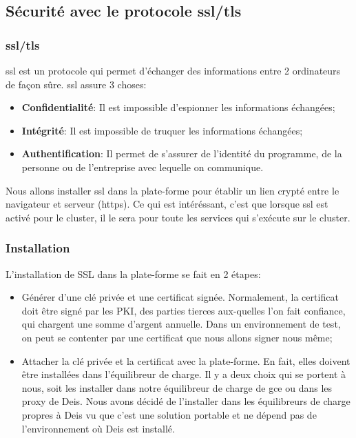 \begin{onehalfspace}
\subsection{Sécurité avec le protocole \acrshort{ssl}/\acrshort{tls}}

\subsubsection{\acrshort{ssl}/\acrshort{tls}}

\acrshort{ssl} est un protocole qui permet d'échanger des informations entre 2 ordinateurs de façon sûre. \acrshort{ssl} assure 3 choses:

\begin{itemize}
	\item \textbf{Confidentialité}: Il est impossible d'espionner les informations échangées;
	\item \textbf{Intégrité}: Il est impossible de truquer les informations échangées;
	\item \textbf{Authentification}: Il permet de s'assurer de l'identité du programme, de la personne ou de l'entreprise avec lequelle on communique.
\end{itemize}



Nous allons installer \acrshort{ssl} dans la plate-forme pour établir un lien crypté entre le navigateur et serveur (\acrshort{https}). Ce qui est intéréssant, c'est que lorsque \acrshort{ssl} est activé pour le cluster, il le sera pour toute les services qui s'exécute sur le cluster.


\subsubsection{Installation}

L'installation de SSL dans la plate-forme se fait en 2 étapes:
\begin{itemize}
	\item Générer d'une clé privée et une certificat signée. Normalement, la certificat doit être signé par les PKI, des parties tierces aux-quelles l'on fait confiance, qui chargent une somme d'argent annuelle. Dans un environnement de test, on peut se contenter par une certificat que nous allons signer nous même;
	\item Attacher la clé privée et la certificat avec la plate-forme. En fait, elles doivent être installées dans l'équilibreur de charge. Il y a deux choix qui se portent à nous, soit les installer dans notre équilibreur de charge de \acrshort{gce} ou dans les proxy de Deis. Nous avons décidé de l'installer dans les équilibreurs de charge propres à Deis vu que c'est une solution portable et ne dépend pas de l'environnement où Deis est installé.
\end{itemize}


\end{onehalfspace}
